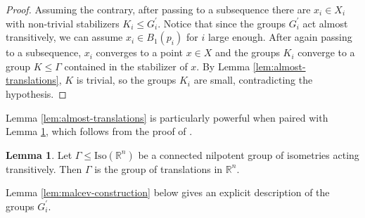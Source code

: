 \documentclass[12pt]{amsart}
\theoremstyle{definition}
\def\fnum{equation}
\newtheorem{lemma}[\fnum]{Lemma}
\numberwithin{equation}{section}
\newcommand{\iso}{\text{Iso}}
\begin{document}
\begin{proof}
    Assuming the contrary, after passing to a subsequence there are $x_i \in X_i$ with non-trivial stabilizers $K_i \leq G_i^{\prime}$. Notice that since the groups $G_i^{\prime}$ act almost transitively, we can assume $x_i \in B_1(p_i)$ for $i$ large enough.  After again passing to a subsequence, $x_i$ converges to a point $x \in X$ and the groups $K_i$  converge to a group $K \leq \Gamma $ contained in the stabilizer of $x$. By Lemma \ref{lem:almost-translations}, $K$ is trivial, so the groups $K_i$ are small, contradicting the hypothesis. 
 \end{proof}

Lemma \ref{lem:almost-translations} is particularly powerful when paired with Lemma \ref{lem:euclidean-nilpotent-groups}, which follows from the proof of \cite[Corollary 4.2.7]{thurston}.

\begin{lemma}\label{lem:euclidean-nilpotent-groups}
    Let $\Gamma \leq \iso (\mathbb{R}^n)$ be a connected nilpotent group of isometries acting transitively. Then $\Gamma$ is the group of translations in $\mathbb{R}^n$. 
\end{lemma}

Lemma \ref{lem:malcev-construction} below gives an explicit description of the groups $G_i^{\prime}$.  
 
\end{document}
